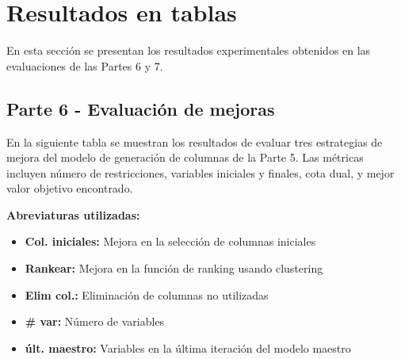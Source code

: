 \documentclass[a4paper,12pt]{article}
\begin{document}
\clearpage

\section{Resultados en tablas}

En esta sección se presentan los resultados experimentales obtenidos en las evaluaciones de las Partes 6 y 7.

\subsection{Parte 6 - Evaluación de mejoras}

En la siguiente tabla se muestran los resultados de evaluar tres estrategias de mejora del modelo de generación de columnas de la Parte 5. Las métricas incluyen número de restricciones, variables iniciales y finales, cota dual, y mejor valor objetivo encontrado.

\textbf{Abreviaturas utilizadas:}
\begin{itemize}
    \item \textbf{Col. iniciales:} Mejora en la selección de columnas iniciales
    \item \textbf{Rankear:} Mejora en la función de ranking usando clustering
    \item \textbf{Elim col.:} Eliminación de columnas no utilizadas
    \item \textbf{\# var:} Número de variables
    \item \textbf{últ. maestro:} Variables en la última iteración del modelo maestro
\end{itemize}
\end{document}
